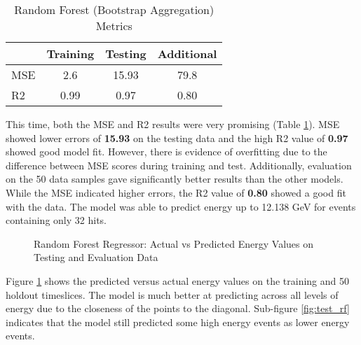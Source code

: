 \begin{table}[ht!]
    \centering
    \begin{tabular}{l c c c}
    \hline
        & Training & Testing & Additional \\
    \hline
    MSE & 2.6 &  15.93 & 79.8 \\
    R2  & 0.99 & 0.97 & 0.80 \\ 
    \hline
    \end{tabular}
    \caption{Random Forest (Bootstrap Aggregation)  Metrics}
    \label{tab:rf_scores}
\end{table}

This time, both the MSE and R2 results were very promising (Table \ref{tab:rf_scores}). MSE showed lower errors of \textbf{15.93} on the testing data and the high R2 value of \textbf{0.97} showed good model fit. However, there is evidence of overfitting due to the difference between MSE scores during training and test. Additionally, evaluation on the 50 data samples gave significantly better results than the other models. While the MSE indicated higher errors, the R2 value of \textbf{0.80} showed a good fit with the data. The model was able to predict energy up to 12.138 GeV for events containing only 32 hits. 

\begin{figure}[ht!]   
\centering
{}
\caption[]{Random Forest Regressor: Actual vs Predicted Energy Values on Testing and Evaluation Data}
\label{fig:results_rf}
\end{figure}

Figure \ref{fig:results_rf} shows the predicted versus actual energy values on the training and 50 holdout timeslices. The model is much better at predicting across all levels of energy due to the closeness of the points to the diagonal. Sub-figure \ref{fig:test_rf} indicates that the model still predicted some high energy events as lower energy events. 


